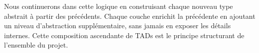 Nous continuerons dans cette logique en construisant chaque nouveau type abstrait à partir des précédents. Chaque couche enrichit la précédente en ajoutant un niveau d'abstraction supplémentaire, sans jamais en exposer les détails internes. Cette composition ascendante de TADs est le principe structurant de l'ensemble du projet.
